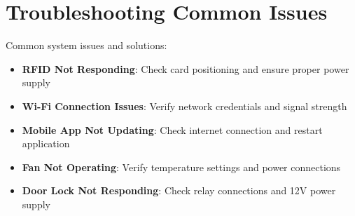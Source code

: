 \documentclass[12pt,a4paper]{report}
\begin{document}
\section*{Troubleshooting Common Issues}
\noindent Common system issues and solutions:
\begin{itemize}
\item \textbf{RFID Not Responding}: Check card positioning and ensure proper power supply
\item \textbf{Wi-Fi Connection Issues}: Verify network credentials and signal strength
\item \textbf{Mobile App Not Updating}: Check internet connection and restart application
\item \textbf{Fan Not Operating}: Verify temperature settings and power connections
\item \textbf{Door Lock Not Responding}: Check relay connections and 12V power supply
\end{itemize}


\end{document}
